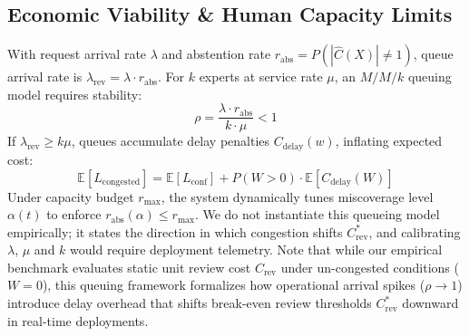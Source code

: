 \documentclass{ieeetj}
\begin{document}
\subsection{Economic Viability \& Human Capacity Limits}
With request arrival rate $\lambda$ and abstention rate $r_{\mathrm{abs}} = P(|\hat{C}(X)| \neq 1)$, queue arrival rate is $\lambda_{\mathrm{rev}} = \lambda \cdot r_{\mathrm{abs}}$. For $k$ experts at service rate $\mu$, an $M/M/k$ queuing model requires stability:
\begin{equation}
\rho = \frac{\lambda \cdot r_{\mathrm{abs}}}{k \cdot \mu} < 1
\end{equation}
If $\lambda_{\mathrm{rev}} \ge k \mu$, queues accumulate delay penalties $C_{\mathrm{delay}}(w)$, inflating expected cost:
\begin{equation}
\mathbb{E}[L_{\mathrm{congested}}] = \mathbb{E}[L_{\mathrm{conf}}] + P(W > 0) \cdot \mathbb{E}[C_{\mathrm{delay}}(W)]
\end{equation}
Under capacity budget $r_{\max}$, the system dynamically tunes miscoverage level $\alpha(t)$ to enforce $r_{\mathrm{abs}}(\alpha) \le r_{\max}$. We do not instantiate this queueing model empirically; it states the direction in which congestion shifts $C_{\mathrm{rev}}^*$, and calibrating $\lambda$, $\mu$ and $k$ would require deployment telemetry. Note that while our empirical benchmark evaluates static unit review cost $C_{\mathrm{rev}}$ under un-congested conditions ($W=0$), this queuing framework formalizes how operational arrival spikes ($\rho \to 1$) introduce delay overhead that shifts break-even review thresholds $C_{\mathrm{rev}}^*$ downward in real-time deployments.
\end{document}
